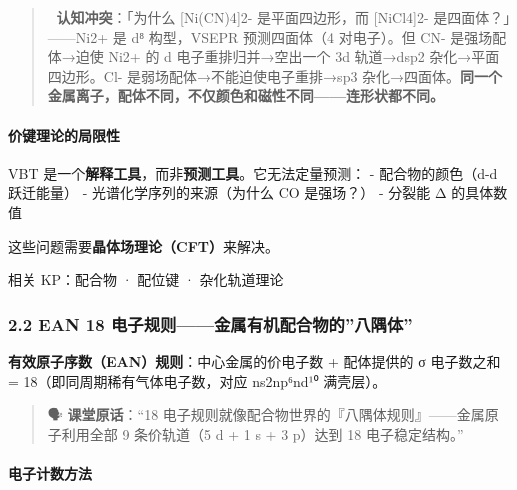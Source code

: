 \documentclass[a4paper,11pt]{ctexart}
\begin{document}
\begin{quote}
🧠 \textbf{认知冲突}：「为什么 {[}Ni(CN)4{]}2- 是平面四边形，而 {[}NiCl4{]}2- 是四面体？」------Ni2+ 是 d⁸ 构型，VSEPR 预测四面体（4 对电子）。但 CN- 是强场配体→迫使 Ni2+ 的 d 电子重排归并→空出一个 3d 轨道→dsp2 杂化→平面四边形。Cl- 是弱场配体→不能迫使电子重排→sp3 杂化→四面体。\textbf{同一个金属离子，配体不同，不仅颜色和磁性不同------连形状都不同。}
\end{quote}

\paragraph{价键理论的局限性}\label{ux4ef7ux952eux7406ux8bbaux7684ux5c40ux9650ux6027}

VBT 是一个\textbf{解释工具}，而非\textbf{预测工具}。它无法定量预测：
- 配合物的颜色（d-d 跃迁能量）
- 光谱化学序列的来源（为什么 CO 是强场？）
- 分裂能 Δ 的具体数值

这些问题需要\textbf{晶体场理论（CFT）}来解决。

相关 KP：配合物 · 配位键 · 杂化轨道理论

\subsubsection{2.2 EAN 18 电子规则------金属有机配合物的''八隅体''}\label{ean-18-ux7535ux5b50ux89c4ux5219ux91d1ux5c5eux6709ux673aux914dux5408ux7269ux7684ux516bux9685ux4f53}

\textbf{有效原子序数（EAN）规则}：中心金属的价电子数 + 配体提供的 σ 电子数之和 = 18（即同周期稀有气体电子数，对应 ns2np⁶nd¹⁰ 满壳层）。

\begin{quote}
🗣️ \textbf{课堂原话}：``18 电子规则就像配合物世界的『八隅体规则』------金属原子利用全部 9 条价轨道（5 d + 1 s + 3 p）达到 18 电子稳定结构。''
\end{quote}

\paragraph{电子计数方法}\label{ux7535ux5b50ux8ba1ux6570ux65b9ux6cd5}
\end{document}
